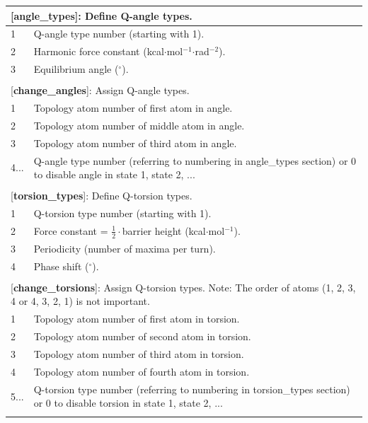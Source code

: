 \documentclass[10pt,oneside,pdftex]{article}
\begin{document}
\begin{longtable}{|p{53pt}|p{181pt}|p{160pt}|}
\multicolumn{3}{p{394pt}}{[\textbf{angle\_types}]: Define Q-angle types.}\\
\hline 1 & \multicolumn{2}{p{341pt}|}{Q-angle type number (starting with 1).}\\
\hline 2 & \multicolumn{2}{p{341pt}|}{Harmonic force constant (kcal$\cdot$mol$^{-1}$$\cdot$rad$^{-2}$).}\\
\hline 3 & \multicolumn{2}{p{341pt}|}{Equilibrium angle ($^{\circ}$).}\\
\hline
\multicolumn{3}{p{394pt}}{}\\

\multicolumn{3}{p{394pt}}{[\textbf{change\_angles}]: Assign Q-angle types.}\\
\hline 1 & \multicolumn{2}{p{341pt}|}{Topology atom number of first atom in angle.}\\
\hline 2 & \multicolumn{2}{p{341pt}|}{Topology atom number of middle atom in angle.}\\
\hline 3 & \multicolumn{2}{p{341pt}|}{Topology atom number of third atom in angle.}\\
\hline 4... & \multicolumn{2}{p{341pt}|}{Q-angle type number (referring to numbering in angle\_types section) or 0 to disable angle in state 1, state 2, ...}\\
\hline
\multicolumn{3}{p{394pt}}{}\\

\multicolumn{3}{p{394pt}}{[\textbf{torsion\_types}]: Define Q-torsion types.}\\
\hline 1 & \multicolumn{2}{p{341pt}|}{Q-torsion type number (starting with 1).}\\
\hline 2 & \multicolumn{2}{p{341pt}|}{Force constant = $\frac{1}{2}\cdot$barrier height (kcal$\cdot$mol$^{-1}$).}\\
\hline 3 & \multicolumn{2}{p{341pt}|}{Periodicity (number of maxima per turn).}\\
\hline 4 & \multicolumn{2}{p{341pt}|}{Phase shift ($^{\circ}$).}\\
\hline
\multicolumn{3}{p{394pt}}{}\\

\multicolumn{3}{p{394pt}}{[\textbf{change\_torsions}]: Assign Q-torsion types. Note: The order of atoms (1, 2, 3, 4 or 4, 3, 2, 1) is not important.}\\
\hline 1 & \multicolumn{2}{p{341pt}|}{Topology atom number of first atom in torsion.}\\
\hline 2 & \multicolumn{2}{p{341pt}|}{Topology atom number of second atom in torsion.}\\
\hline 3 & \multicolumn{2}{p{341pt}|}{Topology atom number of third atom in torsion.}\\
\hline 4 & \multicolumn{2}{p{341pt}|}{Topology atom number of fourth atom in torsion.}\\
\hline 5... & \multicolumn{2}{p{341pt}|}{Q-torsion type number (referring to numbering in torsion\_types section) or 0 to disable torsion in state 1, state 2, ...}\\
\hline
\multicolumn{3}{p{394pt}}{}\\


\end{longtable}
\end{document}
